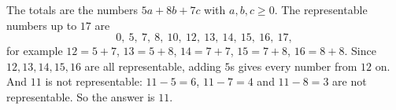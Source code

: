 The totals are the numbers $5a+8b+7c$ with $a,b,c\ge0$. The representable numbers up to $17$ are
\[0,\ 5,\ 7,\ 8,\ 10,\ 12,\ 13,\ 14,\ 15,\ 16,\ 17,\]
for example $12=5+7$, $13=5+8$, $14=7+7$, $15=7+8$, $16=8+8$. Since $12,13,14,15,16$ are all representable, adding $5$s gives every number from $12$ on. And $11$ is not representable: $11-5=6$, $11-7=4$ and $11-8=3$ are not representable. So the answer is $\boxed{11}$.
